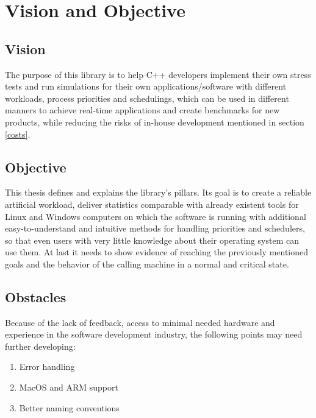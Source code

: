 \section{Vision and Objective}
\subsection{Vision}
The purpose of this library is to help C++ developers implement their own stress tests and run simulations for their own applications/software with different workloads, process priorities and schedulings, which can be used in different manners to achieve real-time applications and create benchmarks for new products, while reducing the risks of in-house development mentioned in section \ref{costs}.
\subsection{Objective}
\label{objective}
This thesis defines and explains the library's pillars. Its goal is to create a reliable artificial workload, deliver statistics comparable with already existent tools for Linux and Windows computers on which the software is running with additional easy-to-understand and intuitive methods for handling priorities and schedulers, so that even users with very little knowledge about their operating system can use them. At last it needs to show evidence of reaching the previously mentioned goals and the behavior of the calling machine in a normal and critical state.  
\subsection{Obstacles}
Because of the lack of feedback, access to minimal needed hardware and experience in the software development industry, the following points may need further developing:
\begin{enumerate}
	\item Error handling
	\item MacOS and ARM support
	\item Better naming conventions
\end{enumerate}

